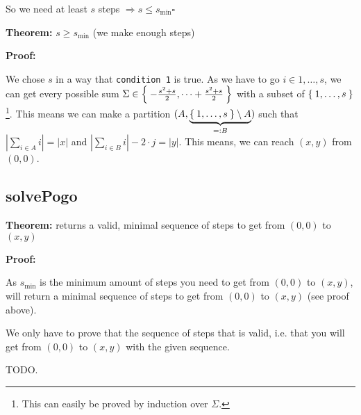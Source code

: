 \documentclass[a4paper]{scrartcl}
\newenvironment{myindentpar}[1]%
 {\begin{list}{}%
         {\setlength{\leftmargin}{#1}}%
         \item[]%
 }
 {\end{list}}
\begin{document}
\begin{myindentpar}{1cm}
\begin{myindentpar}{1cm}
So we need at least $s$ steps $\Rightarrow s \leq s_{\min} \square$
\end{myindentpar}

\textbf{Theorem: } $s \geq s_{\min}$ (we make enough steps)

\textbf{Proof: } 
\begin{myindentpar}{1cm}
We chose $s$ in a way that \texttt{condition 1} is true.
As we have to go $i \in 1,\dots,s$, we can get every possible sum $\Sigma \in \Set{-\frac{s^2+s}{2}, \dots +\frac{s^2+s}{2}}$
with a subset of $\Set{1, \dots, s}$\footnote{This can easily be proved by induction over $\Sigma$.}.
This means we can make a partition $(A, \underbrace{\Set{1, \dots, s} \setminus A}_{=: B})$
such that $|\sum_{i \in A} i| = |x|$ and $|\sum_{i \in B} i|-2\cdot j = |y|$. 
This means, we can reach $(x,y)$ from $(0,0)$.
\end{myindentpar}
\end{myindentpar}

\subsection{solvePogo}
\textbf{Theorem: }  returns a valid, minimal sequence of steps to get from $(0, 0)$ to $(x,y)$

\textbf{Proof: } 
\begin{myindentpar}{1cm}
As $s_{\min}$ is the minimum amount of steps you need to get from 
$(0,0)$ to $(x,y)$,  will return a minimal 
sequence of steps to get from $(0, 0)$ to $(x,y)$ (see proof above).

We only have to prove that the sequence of steps that 
is valid, i.e. that you will get from $(0,0)$ to $(x,y)$ with the given
sequence.

TODO.
\end{myindentpar}
\end{document}
